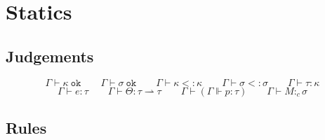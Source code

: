 \documentclass[11pt]{article}
\newcommand{\ms}[1]{\ensuremath{\mathsf{#1}}}
\newcommand{\irl}[1]{\mathtt{#1}}
\newcommand{\purity}{c}
\newcommand{\sigture}{\sigma}
\newcommand{\pat}{p}
\newcommand{\kind}{\kappa}
\newcommand{\typ}{\tau}
\newcommand{\term}{e}
\newcommand{\tagmetavar}{\Theta}
\newcommand{\modl}{M}
\newcommand{\ctx}{\Gamma}
\newcommand{\judge}[2]{#1 \vdash #2}
\newcommand{\okay}[1]{#1\ \irl{ok}}
\newcommand{\subkind}[2]{#1 <: #2}
\newcommand{\subsig}[2]{#1 <: #2}
\newcommand{\judgeexact}[2]{#1 \Vdash #2}
\begin{document}


\section{Statics}

\subsection{Judgements}

\[
\judge{\ctx}{\okay{\kind}}
\qquad
\judge{\ctx}{\okay{\sigture}}
\qquad
\judge{\ctx}{\subkind{\kind}{\kind}}
\qquad
\judge{\ctx}{\subsig{\sigture}{\sigture}}
\qquad
\judge{\ctx}{\typ : \kind}
\]
\[
\judge{\ctx}{\term : \typ}
\qquad
\judge{\ctx}{\tagmetavar : \typ \rightharpoonup \typ}
\qquad
\judge{\ctx}{(\judgeexact{\ctx}{\pat : \typ})}
\qquad
\judge{\ctx}{\modl :_{\purity} \sigture}
\]

\subsection{Rules}
\end{document}
